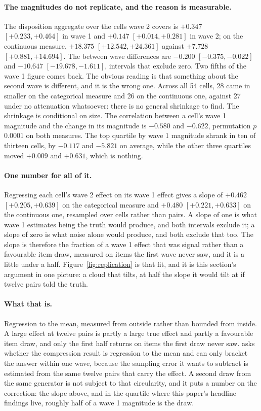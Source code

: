 \paragraph{The magnitudes do not replicate, and the reason is measurable.}
The disposition aggregate over the cells wave 2 covers is $+0.347$ $[+0.233,
+0.464]$ in wave 1 and $+0.147$ $[+0.014, +0.281]$ in wave 2; on the
continuous measure, $+18.375$ $[+12.542, +24.361]$ against $+7.728$
$[+0.881, +14.694]$. The between wave differences are $-0.200$ $[-0.375,
-0.022]$ and $-10.647$ $[-19.678, -1.611]$, intervals that exclude zero. Two
fifths of the wave 1 figure comes back. The obvious reading is that something
about the second wave is different, and it is the wrong one. Across all 54
cells, 28 came in smaller on the categorical measure and 26 on the
continuous one, against 27 under no attenuation whatsoever: there is no
general shrinkage to find. The shrinkage is conditional on size. The
correlation between a cell's wave 1 magnitude and the change in its magnitude
is $-0.580$ and $-0.622$, permutation $p$ 0.0001 on both measures. The top
quartile by wave 1 magnitude shrank in ten of thirteen cells, by $-0.117$ and
$-5.821$ on average, while the other three quartiles moved $+0.009$ and
$+0.631$, which is nothing.

\paragraph{One number for all of it.} Regressing each cell's wave 2 effect on
its wave 1 effect gives a slope of $+0.462$ $[+0.205, +0.639]$ on the
categorical measure and $+0.480$ $[+0.221, +0.633]$ on the continuous one,
resampled over cells rather than pairs. A slope of one is what wave 1
estimates being the truth would produce, and both intervals exclude it; a
slope of zero is what noise alone would produce, and both exclude that too.
The slope is therefore the fraction of a wave 1 effect that was signal rather
than a favourable item draw, measured on items the first wave never saw, and
it is a little under a half. Figure~\ref{fig:replication} is that fit, and
it is this section's argument in one picture: a cloud that tilts, at half the
slope it would tilt at if twelve pairs told the truth.

\paragraph{What that is.} Regression to the mean, measured from outside
rather than bounded from inside. A large effect at twelve pairs is partly a
large true effect and partly a favourable item draw, and only the first half
returns on items the first draw never saw.  asks whether
the compression result is regression to the mean and can only bracket the
answer within one wave, because the sampling error it wants to subtract is
estimated from the same twelve pairs that carry the effect. A second draw
from the same generator is not subject to that circularity, and it puts a
number on the correction: the slope above, and in the quartile where this
paper's headline findings live, roughly half of a wave 1 magnitude is the
draw.

